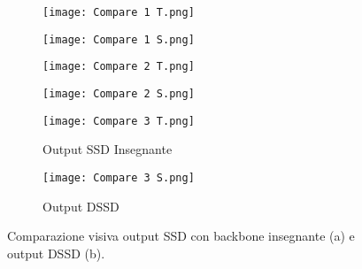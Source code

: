 \begin{figure}[ht] 
    \begin{subfigure}[b]{0.5\linewidth}
      \centering
      \texttt{[image: Compare 1 T.png]} 
    \end{subfigure}%
    \begin{subfigure}[b]{0.5\linewidth}
      \centering
      \texttt{[image: Compare 1 S.png]} 
    \end{subfigure} 
    \begin{subfigure}[b]{0.5\linewidth}
      \centering
      \texttt{[image: Compare 2 T.png]} 
    \end{subfigure}%
    \begin{subfigure}[b]{0.5\linewidth}
      \centering
      \texttt{[image: Compare 2 S.png]} 
    \end{subfigure}
    \begin{subfigure}[b]{0.5\linewidth}
        \centering
        \texttt{[image: Compare 3 T.png]} 
        \caption{Output SSD Insegnante} 
    \end{subfigure}%
    \begin{subfigure}[b]{0.5\linewidth}
        \centering
        \texttt{[image: Compare 3 S.png]} 
        \caption{Output DSSD} 
    \end{subfigure}
    \caption{Comparazione visiva output SSD con backbone insegnante (a) e output DSSD (b).}
    \label{esempi_DSSD} 
\end{figure}

